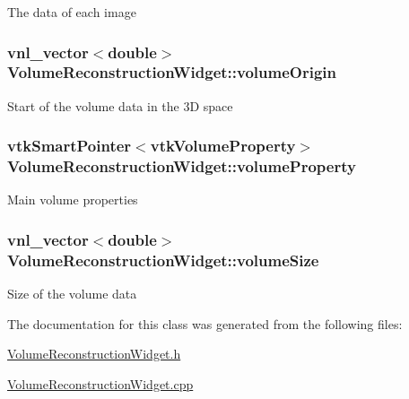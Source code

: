 The data of each image \hypertarget{class_volume_reconstruction_widget_a8a96c61c0e699daeaa349bc94610863b}{
\subsubsection[{volume\-Origin}]{\setlength{\rightskip}{0pt plus 5cm}vnl\-\_\-vector$<$double$>$ {\bf Volume\-Reconstruction\-Widget\-::volume\-Origin}}}\label{d5/d55/class_volume_reconstruction_widget_a8a96c61c0e699daeaa349bc94610863b}
Start of the volume data in the 3\-D space \hypertarget{class_volume_reconstruction_widget_aa019933b9a5cdfee94739d13b383b7b8}{
\subsubsection[{volume\-Property}]{\setlength{\rightskip}{0pt plus 5cm}vtk\-Smart\-Pointer$<$vtk\-Volume\-Property$>$ {\bf Volume\-Reconstruction\-Widget\-::volume\-Property}}}\label{d5/d55/class_volume_reconstruction_widget_aa019933b9a5cdfee94739d13b383b7b8}
Main volume properties \hypertarget{class_volume_reconstruction_widget_ac6e459db730b1349685d3d01e95692bd}{
\subsubsection[{volume\-Size}]{\setlength{\rightskip}{0pt plus 5cm}vnl\-\_\-vector$<$double$>$ {\bf Volume\-Reconstruction\-Widget\-::volume\-Size}}}\label{d5/d55/class_volume_reconstruction_widget_ac6e459db730b1349685d3d01e95692bd}
Size of the volume data 

The documentation for this class was generated from the following files\-:\begin{DoxyCompactItemize}
\item 
\hyperlink{_volume_reconstruction_widget_8h}{Volume\-Reconstruction\-Widget.\-h}\item 
\hyperlink{_volume_reconstruction_widget_8cpp}{Volume\-Reconstruction\-Widget.\-cpp}\end{DoxyCompactItemize}

